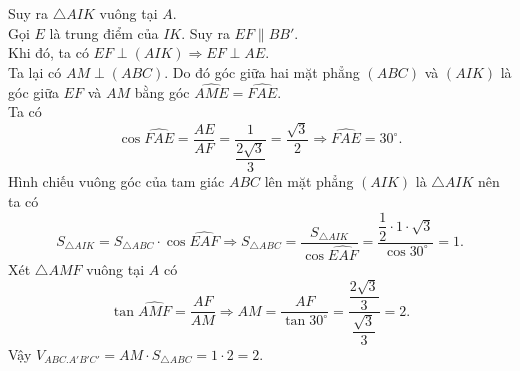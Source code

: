 \begin{ex}
{		Suy  ra $\triangle AIK$ vuông tại $A$.\\
		Gọi $E$ là trung điểm của $IK$. Suy ra  $EF \parallel BB'$.\\
		Khi đó, ta có $EF \perp (AIK) \Rightarrow EF  \perp AE$.\\
		Ta lại có $AM \perp (ABC)$. Do đó  góc giữa hai mặt phẳng $(ABC)$ và $(AIK)$ là góc giữa $EF$ và $AM$ bằng góc $\widehat{AME} = \widehat{FAE}$.\\
		 Ta có
		$$\cos \widehat{FAE} = \dfrac{AE}{AF} =  \dfrac{1}{\dfrac{2\sqrt{3}}{3}} = \dfrac{\sqrt{3}}{2} \Rightarrow \widehat{FAE} = 30^\circ.$$
		Hình chiếu  vuông góc của tam giác $ABC$ lên mặt phẳng $(AIK)$ là $\triangle AIK$ nên ta có
		$$S_{\triangle AIK} = S_{\triangle ABC}\cdot\cos \widehat{EAF}\Rightarrow S_{\triangle ABC} = \dfrac{S_{\triangle AIK}}{\cos \widehat{EAF}} = \dfrac{\dfrac{1}{2}\cdot 1\cdot  \sqrt{3}}{\cos 30^{\circ}} = 1.$$
		Xét  $\triangle AMF$ vuông tại $A$ có
		$$\tan \widehat{AMF} = \dfrac{AF}{AM} \Rightarrow AM = \dfrac{AF}{\tan 30^{\circ}} =  \dfrac{\dfrac{2\sqrt{3}}{3}}{\dfrac{\sqrt{3}}{3}} = 2.$$
		Vậy $V_{ABC.A'B'C'} =  AM\cdot S_{\triangle ABC} = 1\cdot 2=2$.
	} 
\end{ex}


